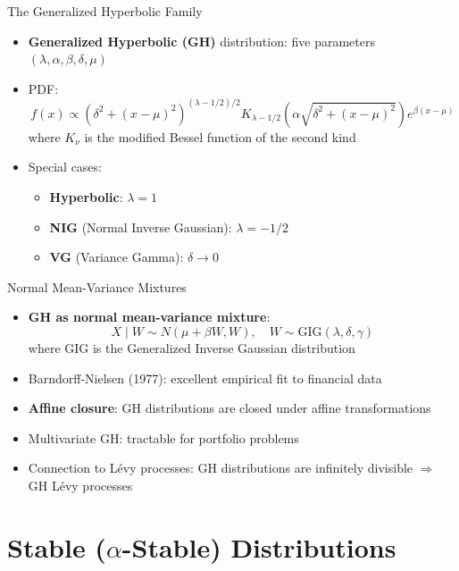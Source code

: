 \documentclass[9pt, aspectratio=169, t]{beamer}
\theoremstyle{definition}
\begin{document}
\begin{frame}{The Generalized Hyperbolic Family}
\begin{itemize}
\item \textbf{Generalized Hyperbolic (GH)} distribution: five parameters $(\lambda, \alpha, \beta, \delta, \mu)$
\item PDF:
\[
f(x) \propto \left(\delta^2 + (x-\mu)^2\right)^{(\lambda - 1/2)/2} K_{\lambda-1/2}\!\left(\alpha\sqrt{\delta^2 + (x-\mu)^2}\right) e^{\beta(x-\mu)}
\]
where $K_\nu$ is the modified Bessel function of the second kind
\item Special cases:
\begin{itemize}
\item \textbf{Hyperbolic}: $\lambda = 1$
\item \textbf{NIG} (Normal Inverse Gaussian): $\lambda = -1/2$
\item \textbf{VG} (Variance Gamma): $\delta \to 0$
\end{itemize}
\end{itemize}
\end{frame}

\begin{frame}{Normal Mean-Variance Mixtures}
\begin{itemize}
\item \textbf{GH as normal mean-variance mixture}:
\[
X \mid W \sim N(\mu + \beta W, W), \quad W \sim \text{GIG}(\lambda, \delta, \gamma)
\]
where GIG is the Generalized Inverse Gaussian distribution
\item Barndorff-Nielsen (1977): excellent empirical fit to financial data
\item \textbf{Affine closure}: GH distributions are closed under affine transformations
\item Multivariate GH: tractable for portfolio problems
\item Connection to L\'{e}vy processes: GH distributions are infinitely divisible $\Rightarrow$ GH L\'{e}vy processes
\end{itemize}
\end{frame}

\section{Stable ($\alpha$-Stable) Distributions}
\end{document}
